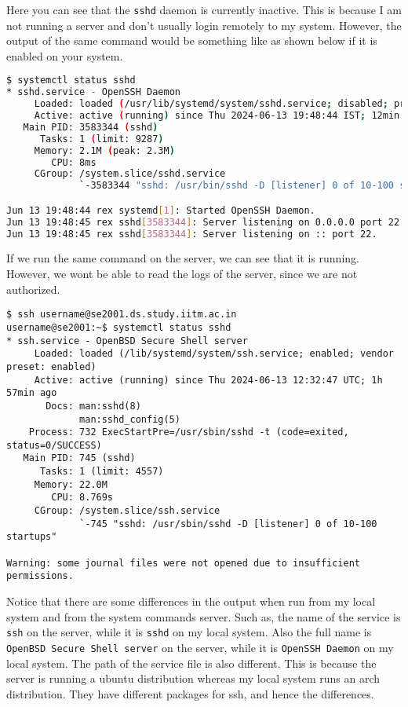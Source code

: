 Here you can see that the \texttt{sshd} daemon is
currently inactive. This is because I am not running
a server and don't usually login remotely to my
system. However, the output of the same command
would be something like as shown below
if it is enabled on your system.


\begin{lstlisting}[language=bash]
$ systemctl status sshd
* sshd.service - OpenSSH Daemon
     Loaded: loaded (/usr/lib/systemd/system/sshd.service; disabled; preset: disabled)
     Active: active (running) since Thu 2024-06-13 19:48:44 IST; 12min ago
   Main PID: 3583344 (sshd)
      Tasks: 1 (limit: 9287)
     Memory: 2.1M (peak: 2.3M)
        CPU: 8ms
     CGroup: /system.slice/sshd.service
             `-3583344 "sshd: /usr/bin/sshd -D [listener] 0 of 10-100 startups"

Jun 13 19:48:44 rex systemd[1]: Started OpenSSH Daemon.
Jun 13 19:48:45 rex sshd[3583344]: Server listening on 0.0.0.0 port 22.
Jun 13 19:48:45 rex sshd[3583344]: Server listening on :: port 22.
\end{lstlisting}

If we run the same command on the server, we can see
that it is running. However, we wont be able to
read the logs of the server, since we are not
authorized.

\begin{lstlisting}
$ ssh username@se2001.ds.study.iitm.ac.in
username@se2001:~$ systemctl status sshd
* ssh.service - OpenBSD Secure Shell server
     Loaded: loaded (/lib/systemd/system/ssh.service; enabled; vendor preset: enabled)
     Active: active (running) since Thu 2024-06-13 12:32:47 UTC; 1h 57min ago
       Docs: man:sshd(8)
             man:sshd_config(5)
    Process: 732 ExecStartPre=/usr/sbin/sshd -t (code=exited, status=0/SUCCESS)
   Main PID: 745 (sshd)
      Tasks: 1 (limit: 4557)
     Memory: 22.0M
        CPU: 8.769s
     CGroup: /system.slice/ssh.service
             `-745 "sshd: /usr/sbin/sshd -D [listener] 0 of 10-100 startups"

Warning: some journal files were not opened due to insufficient permissions.
\end{lstlisting}

\begin{remark}
  Notice that there are some differences in the output
  when run from my local system and from the system
  commands server. Such as, the name of the service
  is \texttt{ssh} on the server, while it is \texttt{sshd}
  on my local system. Also the full name is \texttt{OpenBSD
  Secure Shell server} on the server, while it is
  \texttt{OpenSSH Daemon} on my local system.
  The path of the service file is also different.
  This is because the server is running a ubuntu
  distribution whereas my local system runs an arch
  distribution. They have different packages for
  ssh, and hence the differences.
\end{remark}

